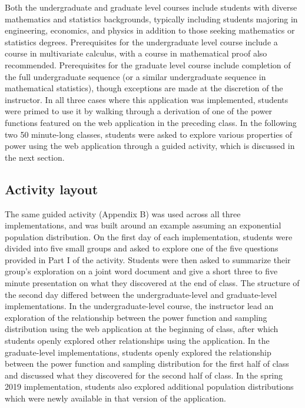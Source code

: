 \documentclass{TISE}
\begin{document}
Both the undergraduate and graduate level courses include students with diverse mathematics and statistics backgrounds, typically including students majoring in engineering, economics, and physics in addition to those seeking mathematics or statistics degrees. Prerequisites for the undergraduate level course include a course in multivariate calculus, with a course in mathematical proof also recommended. Prerequisites for the graduate level course include completion of the full undergraduate sequence (or a similar undergraduate sequence in mathematical statistics), though exceptions are made at the discretion of the instructor. In all three cases where this application was implemented, students were primed to use it by walking through a derivation of one of the power functions featured on the web application in the preceding class. In the following two 50 minute-long classes, students were asked to explore various properties of power using the web application through a guided activity, which is discussed in the next section. 

\subsection{Activity layout}

The same guided activity (Appendix B) was used across all three implementations, and was built around an example assuming an exponential population distribution. On the first day of each implementation, students were divided into five small groups and asked to explore one of the five questions provided in Part I of the activity. Students were then asked to summarize their group's exploration on a joint word document and give a short three to five minute presentation on what they discovered at the end of class. The structure of the second day differed between the undergraduate-level and graduate-level implementations. In the undergraduate-level course, the instructor lead an exploration of the relationship between the power function and sampling distribution using the web application at the beginning of class, after which students openly explored other relationships using the application. In the graduate-level implementations, students openly explored the relationship between the power function and sampling distribution for the first half of class and discussed what they discovered for the second half of class. In the spring 2019 implementation, students also explored additional population distributions which were newly available in that version of the application.
\end{document}
